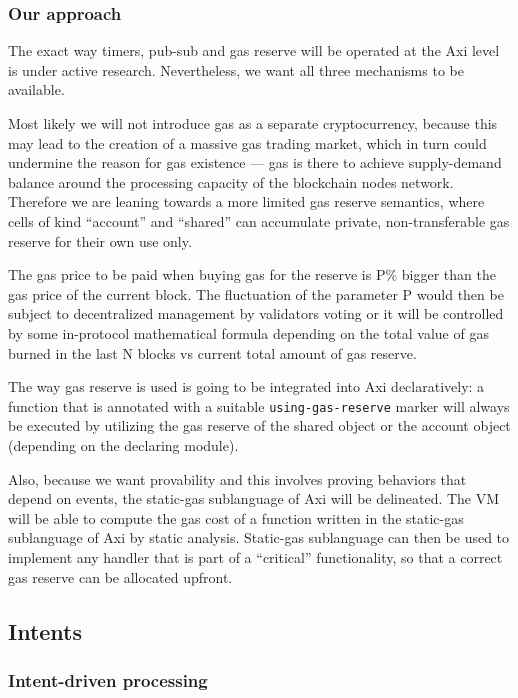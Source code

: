 \documentclass[a4paper]{article}
\newcommand{\code}[1]{{\small \texttt{#1}}}
\begin{document}
\subsubsection{Our approach}

The exact way timers, pub-sub and gas reserve will be operated at the Axi level is under active research. Nevertheless, we want all three mechanisms to be available.

Most likely we will not introduce gas as a separate cryptocurrency, because this may lead to the creation of a massive gas trading market, which in turn could undermine the reason for gas existence --- gas is there to achieve supply-demand balance around the processing capacity of the blockchain nodes network. Therefore we are leaning towards a more limited gas reserve semantics, where cells of kind ``account'' and ``shared'' can accumulate private, non-transferable gas reserve for their own use only.

The gas price to be paid when buying gas for the reserve is P\% bigger than the gas price of the current block. The fluctuation of the parameter P would then be subject to decentralized management by validators voting or it will be controlled by some in-protocol mathematical formula depending on the total value of gas burned in the last N blocks vs current total amount of gas reserve.

The way gas reserve is used is going to be integrated into Axi declaratively: a function that is annotated with a suitable \code{using-gas-reserve} marker will always be executed by utilizing the gas reserve of the shared object or the account object (depending on the declaring module).

Also, because we want provability and this involves proving behaviors that depend on events, the static-gas sublanguage of Axi will be delineated. The VM will be able to compute the gas cost of a function written in the static-gas sublanguage of Axi by static analysis. Static-gas sublanguage can then be used to implement any handler that is part of a ``critical'' functionality, so that a correct gas reserve can be allocated upfront.

\subsection{Intents}

\subsubsection{Intent-driven processing}
\end{document}
